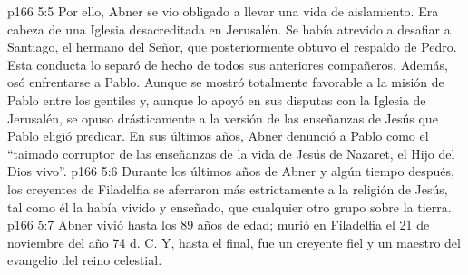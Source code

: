 \vs p166 5:5 Por ello, Abner se vio obligado a llevar una vida de aislamiento. Era cabeza de una Iglesia desacreditada en Jerusalén. Se había atrevido a desafiar a Santiago, el hermano del Señor, que posteriormente obtuvo el respaldo de Pedro. Esta conducta lo separó de hecho de todos sus anteriores compañeros. Además, osó enfrentarse a Pablo. Aunque se mostró totalmente favorable a la misión de Pablo entre los gentiles y, aunque lo apoyó en sus disputas con la Iglesia de Jerusalén, se opuso drásticamente a la versión de las enseñanzas de Jesús que Pablo eligió predicar. En sus últimos años, Abner denunció a Pablo como el “taimado corruptor de las enseñanzas de la vida de Jesús de Nazaret, el Hijo del Dios vivo”.
\vs p166 5:6 Durante los últimos años de Abner y algún tiempo después, los creyentes de Filadelfia se aferraron más estrictamente a la religión de Jesús, tal como él la había vivido y enseñado, que cualquier otro grupo sobre la tierra.
\vs p166 5:7 Abner vivió hasta los 89 años de edad; murió en Filadelfia el 21 de noviembre del año 74 d. C. Y, hasta el final, fue un creyente fiel y un maestro del evangelio del reino celestial.
